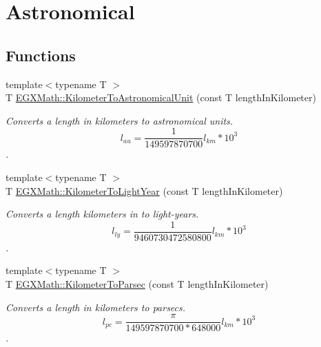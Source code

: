 \hypertarget{group___e_g_x_math-_conversions-_length_conversions-_kilometer-_astronomical}{}\section{Astronomical}
\label{group___e_g_x_math-_conversions-_length_conversions-_kilometer-_astronomical}
\subsection*{Functions}
\begin{DoxyCompactItemize}
\item 
{\footnotesize template$<$typename T $>$ }\\T \mbox{\hyperlink{group___e_g_x_math-_conversions-_length_conversions-_kilometer-_astronomical_ga4c5c2b67611651c04072bfbb394a4ca7}{E\+G\+X\+Math\+::\+Kilometer\+To\+Astronomical\+Unit}} (const T length\+In\+Kilometer)
\begin{DoxyCompactList}\small\item\em Converts a length in kilometers to astronomical units. \[ l_{au}= \frac{1}{149597870700} l_{km} * 10^{3} \]. \end{DoxyCompactList}\item 
{\footnotesize template$<$typename T $>$ }\\T \mbox{\hyperlink{group___e_g_x_math-_conversions-_length_conversions-_kilometer-_astronomical_ga265181afd822c061f51a157da711c0c5}{E\+G\+X\+Math\+::\+Kilometer\+To\+Light\+Year}} (const T length\+In\+Kilometer)
\begin{DoxyCompactList}\small\item\em Converts a length kilometers in to light-\/years. \[ l_{ly}= \frac{1}{9460730472580800} l_{km} * 10^{3} \]. \end{DoxyCompactList}\item 
{\footnotesize template$<$typename T $>$ }\\T \mbox{\hyperlink{group___e_g_x_math-_conversions-_length_conversions-_kilometer-_astronomical_ga0d120dfc56490ce318348950abb25dd1}{E\+G\+X\+Math\+::\+Kilometer\+To\+Parsec}} (const T length\+In\+Kilometer)
\begin{DoxyCompactList}\small\item\em Converts a length in kilometers to parsecs. \[ l_{pc}=\frac{\pi}{149597870700 * 648000} l_{km} * 10^{3} \]. \end{DoxyCompactList}\end{DoxyCompactItemize}


